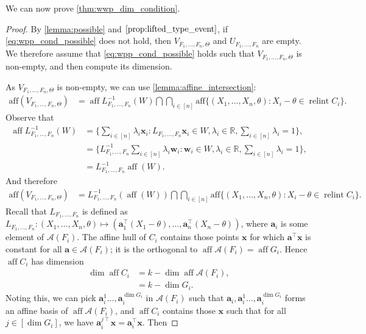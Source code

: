 \documentclass[10pt]{article}
\theoremstyle{definition}
\theoremstyle{remark}
\newcommand{\R}{\mathbb{R}}
\newcommand{\T}{\intercal}
\newcommand{\CType}{F_1,\dots,F_n}
\newcommand{\sample}{ X_1,\dots, X_n}
\DeclareMathOperator{\relint}{relint}
\DeclareMathOperator{\aff}{aff}
\renewcommand{\vec}[1]{\mathbf{#1}}
\newcommand{\A}{\mathcal{A}}
\begin{document}
	We can now prove \cref{thm:wwp_dim_condition}.
	
	\begin{proof}
		By \cref{lemma:possible} and $\cref{prop:lifted_type_event}$, if \cref{eq:wpp_cond_possible} does not hold, then $V_{\CType,\Theta}$ and $U_{\CType}$ are empty. We therefore assume that \cref{eq:wpp_cond_possible} holds such that $V_{\CType,\Theta}$ is non-empty, and then compute its dimension. 
		
		As $V_{\CType,\Theta}$ is non-empty, we can use \cref{lemma:affine_intersection}:
		\begin{align*}
			\text{aff}(V_{\CType,\Theta}) &= \aff L_{\CType}^{-1}(W) \textstyle \bigcap \bigcap_{i \in [n]} \text{aff} \{ (\sample, \theta) : X_i - \theta \in \relint C_i \}.
		\end{align*}
		Observe that
		\begin{align*}
			\aff L_{\CType}^{-1}(W) &= \{\textstyle\sum_{i \in [n]} \lambda_i \vec x_i : L_{\CType} \vec x_i \in W, \lambda_i \in \R, \sum_{i \in [n]} \lambda_i = 1\}, \\
			&= \{L_{\CType}^{-1}\textstyle\sum_{i \in [n]} \lambda_i \vec w_i : \vec w_i \in W, \lambda_i \in \R, \sum_{i \in [n]} \lambda_i = 1\}, \\
			&= L_{\CType}^{-1} \aff(W).
		\end{align*}
		And therefore 
		\begin{align*}
			\text{aff}(V_{\CType,\Theta}) &= L_{\CType}^{-1}(\aff (W)) \textstyle \bigcap \bigcap_{i \in [n]} \text{aff} \{ (\sample, \theta) : X_i - \theta \in \relint C_i \}.
		\end{align*}
		Recall that $L_{\CType}$ is defined as $L_{\CType}: (\sample,\theta) \mapsto \left(\vec a_1^{\T} (X_1-\theta), \dots, \vec a_n^{\T} (X_n-\theta)\right)$, where $\vec a_i$ is some element of $\A(F_i)$. The affine hull of $C_i$ contains those points $\vec x$ for which $\vec a^{\T}\vec x$ is constant for all $\vec a \in \A(F_i)$; it is the orthogonal to $\aff \A(F_i) = \aff G_i$. Hence $\aff C_i$ has dimension 
		\begin{align*}
			\dim \aff C_i &= k - \dim \aff \A(F_i), \\
			&= k - \dim G_i.
		\end{align*}
		Noting this, we can pick $\vec a_i^1 \dots, \vec a_i^{\dim G_i}$ in $\A(F_i)$ such that $\vec a_i, \vec a_i^1 \dots, \vec a_i^{\dim G_i}$ forms an affine basis of $\aff \A(F_i)$, and $\aff C_i$ contains those $\vec x$ such that for all $j \in [\dim G_i]$, we have $\vec a_i^{j\T}\vec x = \vec a_i^{\T}\vec x$. Then 

\end{proof}
\end{document}
